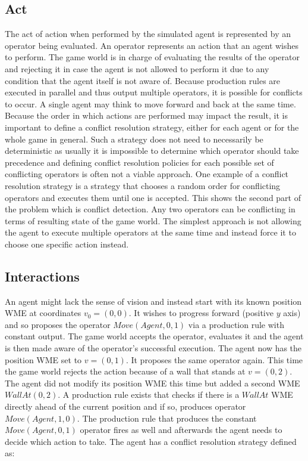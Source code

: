 \subsection{Act}

The act of action when performed by the simulated agent is represented by an operator being evaluated.
An operator represents an action that an agent wishes to perform.
The game world is in charge of evaluating the results of the operator and rejecting it in case the agent is not allowed to perform it due to any condition that the agent itself is not aware of.
Because production rules are executed in parallel and thus output multiple operators, it is possible for conflicts to occur.
A single agent may think to move forward and back at the same time.
Because the order in which actions are performed may impact the result, it is important to define a conflict resolution strategy, either for each agent or for the whole game in general.
Such a strategy does not need to necessarily be deterministic as usually it is impossible to determine which operator should take precedence and defining conflict resolution policies for each possible set of conflicting operators is often not a viable approach.
One example of a conflict resolution strategy is a strategy that chooses a random order for conflicting operators and executes them until one is accepted.
This shows the second part of the problem which is conflict detection.
Any two operators can be conflicting in terms of resulting state of the game world.
The simplest approach is not allowing the agent to execute multiple operators at the same time and instead force it to choose one specific action instead.

\subsection{Interactions}

An agent might lack the sense of vision and instead start with its known position WME at coordinates $v_0=(0, 0)$.
It wishes to progress forward (positive $y$ axis) and so proposes the operator $Move(Agent, 0, 1)$ via a production rule with constant output.
The game world accepts the operator, evaluates it and the agent is then made aware of the operator's successful execution.
The agent now has the position WME set to $v=(0, 1)$.
It proposes the same operator again.
This time the game world rejects the action because of a wall that stands at $v=(0, 2)$.
The agent did not modify its position WME this time but added a second WME $WallAt(0, 2)$.
A production rule exists that checks if there is a $WallAt$ WME directly ahead of the current position and if so, produces operator $Move(Agent, 1, 0)$.
The production rule that produces the constant $Move(Agent, 0, 1)$ operator fires as well and afterwards the agent needs to decide which action to take.
The agent has a conflict resolution strategy defined as:

